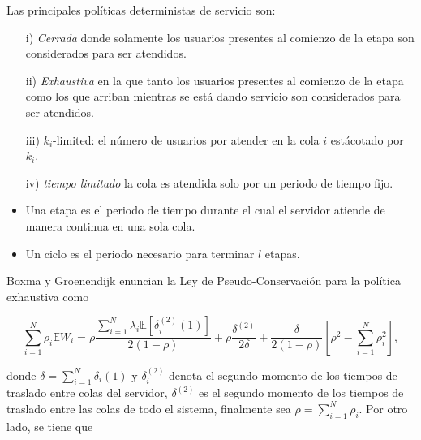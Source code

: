 \documentclass{article}
\newcommand{\esp}{\mathbb{E}}
\begin{document}
Las principales pol\'iticas deterministas de servicio son:
\begin{itemize}

\item[i)] {\em Cerrada} donde solamente los usuarios presentes al comienzo de la etapa son considerados para ser atendidos.

\item[ii)] {\em Exhaustiva} en la que tanto los usuarios presentes al comienzo de la etapa como los que arriban   mientras se est\'a dando servicio son considerados para ser atendidos.

\item[iii)] $k_{i}$-limited: el n\'umero de usuarios por atender en la cola $i$ est\' acotado por $k_{i}$.

\item[iv)] {\em tiempo limitado} la cola es atendida solo por un periodo de tiempo fijo.
\end{itemize}

\begin{itemize}
\item Una etapa es el periodo de tiempo durante el cual el
servidor atiende de manera continua en una sola cola.

\item Un ciclo  es el periodo necesario para terminar $l$ etapas.

\end{itemize}


Boxma y Groenendijk \cite{Boxma2} enuncian la Ley de
Pseudo-Conservaci\'on para la pol\'itica exhaustiva como

\begin{equation}\label{LPCPE}
\sum_{i=1}^{N}\rho_{i}\esp
W_{i}=\rho\frac{\sum_{i=1}^{N}\lambda_{i}\esp\left[\delta_{i}^{(2)}\left(1\right)\right]}{2\left(1-\rho\right)}+\rho\frac{\delta^{(2)}}{2\delta}+\frac{\delta}{2\left(1-\rho\right)}\left[\rho^{2}-\sum_{i=1}^{N}\rho_{i}^{2}\right],
\end{equation}

donde $\delta=\sum_{i=1}^{N}\delta_{i}\left(1\right)$ y
$\delta_{i}^{(2)}$ denota el segundo momento de los tiempos de traslado entre colas del servidor, $\delta^{(2)}$ es el segundo momento de los tiempos de traslado entre las colas de todo el sistema, finalmente sea $\rho=\sum_{i=1}^{N}\rho_{i}$. Por otro lado, se tiene que
\end{document}
